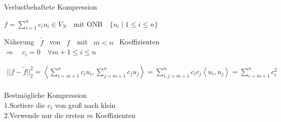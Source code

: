 	\begin{frame}{Verlustbehaftete Kompression}
		\begin{description}[r]
			\item[\alert{\sf Gegeben\ }]$f=\sum_{i=1}^{n}c_iu_i\in V_N$\ \ mit ONB\ \ $\{u_i\mid 1\leq i\leq n\}$\vspace{3mm}\pause
			\item[\alert{\sf Gesucht\ \ }]Näherung \ $\tilde{f}$ \ von \ $f$\ \ mit \ $m<n$ \ Koeffizienten\\ \hspace{16mm}$\Rightarrow$\ \ $c_i=0\quad\forall m+1\leq i\leq n$
		\end{description}\vspace{-2mm}\pause
		\begin{align*}
		||f-\tilde{f}||_2^2	= \left\langle \sum_{i =m+1}^n c_i u_i , \sum_{j =m+1}^n c_j u_j \right\rangle
		= \sum_{i,j =m+1}^n c_i c_j \left\langle  u_i , u_j \right\rangle 
		= \sum_{i =m+1}^n c_i^2
		\end{align*}\ \vspace{1.5mm} \\ \pause
		\alert{Bestmögliche Kompression}\vspace{1mm}\\ \hspace{18mm}1.\quad Sortiere die $c_i$ von groß nach klein\\ \hspace{18mm}2.\quad Verwende nur die ersten $m$ Koeffizienten
	\end{frame}

